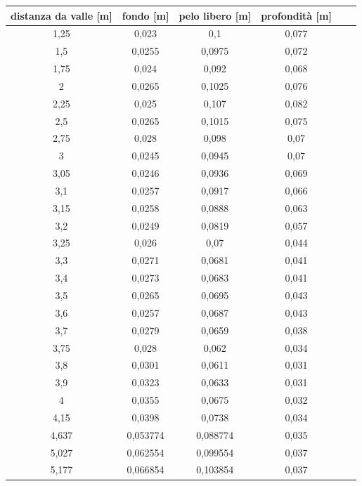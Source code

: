 \documentclass[12pt]{article} %
\begin{document}
\newpage
\vspace*{\fill}
\begin{table}[H]
\scriptsize\sffamily
\centering
\begin{tabular}{cccccc}
\textbf{distanza da valle {[}m{]}}  & \textbf{fondo {[}m{]}}              & \textbf{pelo libero {[}m{]}}        & \textbf{profondità {[}m{]}}         &  &  \\\hline
1,25   & 0,023    & 0,1      & 0,077 &  &  \\
1,5    & 0,0255   & 0,0975   & 0,072 &  &  \\
1,75   & 0,024    & 0,092    & 0,068 &  &  \\
2      & 0,0265   & 0,1025   & 0,076 &  &  \\
2,25   & 0,025    & 0,107    & 0,082 &  &  \\
2,5    & 0,0265   & 0,1015   & 0,075 &  &  \\
2,75   & 0,028    & 0,098    & 0,07  &  &  \\
3      & 0,0245   & 0,0945   & 0,07  &  &  \\
3,05   & 0,0246   & 0,0936   & 0,069 &  &  \\
3,1    & 0,0257   & 0,0917   & 0,066 &  &  \\
3,15   & 0,0258   & 0,0888   & 0,063 &  &  \\
3,2    & 0,0249   & 0,0819   & 0,057 &  &  \\
3,25   & 0,026    & 0,07     & 0,044 &  &  \\
3,3    & 0,0271   & 0,0681   & 0,041 &  &  \\
3,4    & 0,0273   & 0,0683   & 0,041 &  &  \\
3,5    & 0,0265   & 0,0695   & 0,043 &  &  \\
3,6    & 0,0257   & 0,0687   & 0,043 &  &  \\
3,7    & 0,0279   & 0,0659   & 0,038 &  &  \\
3,75   & 0,028    & 0,062    & 0,034 &  &  \\
3,8    & 0,0301   & 0,0611   & 0,031 &  &  \\
3,9    & 0,0323   & 0,0633   & 0,031 &  &  \\
4      & 0,0355   & 0,0675   & 0,032 &  &  \\
4,15   & 0,0398   & 0,0738   & 0,034 &  &  \\
4,637  & 0,053774 & 0,088774 & 0,035 &  &  \\
5,027  & 0,062554 & 0,099554 & 0,037 &  &  \\
5,177  & 0,066854 & 0,103854 & 0,037 &  &  \\

\end{tabular}
\end{table}
\end{document}
